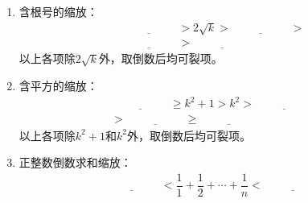 \documentclass{article}
\newif\ifte
\renewcommand\geq\geqslant
\begin{document}
\begin{multicols}{2}
\begin{enumerate}[leftmargin=20pt]
\item 含根号的缩放：
\begin{gather*}
    \underline{\ \ifte \sqrt{k+1}+\sqrt{k}\else \hspace{2cm} \fi\ }
    >2\sqrt{k}>\underline{\ \ifte \sqrt{k+\dfrac{1}{2}}+
    \sqrt{k-\dfrac{1}{2}} \else \hspace{2cm} \fi\ }> \\
    \underline{\ \ifte \sqrt{k+1}+\sqrt{k-1}\else \hspace{2cm} \fi\ }
    >\underline{\ \ifte \sqrt{k}+\sqrt{k-1}\else \hspace{2cm} \fi\ }
\end{gather*}
以上各项除$ 2\sqrt{k} $外，取倒数后均可裂项。

\item 含平方的缩放：
\begin{gather*}
    \underline{\ \ifte k(k+1)\else \hspace{2cm} \fi\ }\geq k^2+1>k^2>
    \underline{\ \ifte \left( k-\dfrac{1}{2}\right)\left(k+
    \dfrac{1}{2}\right)\else \hspace{2cm} \fi\ } \\
    >\underline{\ \ifte (k-1)(k+1)\else \hspace{2cm} \fi\ } \geq
    \underline{\ \ifte k(k-1)\else \hspace{2cm} \fi\ }
\end{gather*}
以上各项除$ k^2+1 $和$ k^2 $外，取倒数后均可裂项。

\item 正整数倒数求和缩放：
\begin{gather*}
    \underline{\ \ifte \ln(n+1)\else \hspace{2cm} \fi\ }
    <\dfrac{1}{1}+\dfrac{1}{2}+\cdots +\dfrac{1}{n}
    <\underline{\ \ifte 1+\ln n\else \hspace{2cm} \fi\ }
\end{gather*}


\end{enumerate}
\end{multicols}
\end{document}
